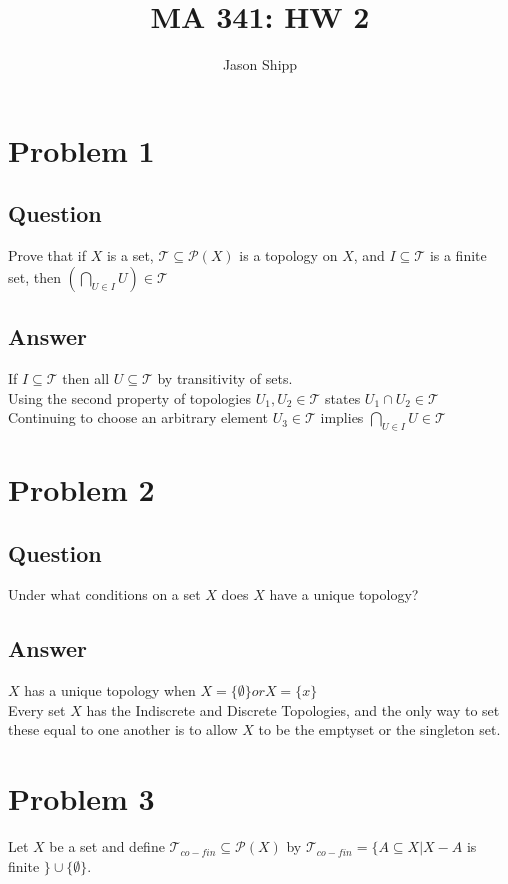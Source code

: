 \documentclass{article}
\begin{document}
\title{MA 341: HW 2}
\author{Jason Shipp}
\maketitle
\section*{Problem 1}
\subsection*{Question}
Prove that if \(X\) is a set, \(\mathscr{T} \subseteq \mathscr{P}(X)\) is a topology on \(X\), and \(I \subseteq \mathscr{T}\) is a finite set, then \((\bigcap\limits_{U \in I}U) \in \mathscr{T}\)
\subsection*{Answer}
If \(I \subseteq \mathscr{T}\) then all \(U \subseteq \mathscr{T}\) by transitivity of sets. 
\\ Using the second property of topologies \(U_{1}, U_{2} \in \mathscr{T}\) states \(U_{1} \cap U_{2} \in \mathscr{T}\)
\\ Continuing to choose an arbitrary element \(U_{3} \in \mathscr{T}\) implies \(\bigcap\limits_{U \in I}U \in \mathscr{T}\)
\section*{Problem 2}
\subsection*{Question}
Under what conditions on a set \(X\) does \(X\) have a unique topology?
\subsection*{Answer}
\(X\) has a unique topology when \(X = \{\emptyset\} or X = \{x\} \)
\\ Every set \(X\) has the Indiscrete and Discrete Topologies, and the only way to set these equal to one another is to allow \(X\) to be the emptyset or the singleton set.
\section*{Problem 3}
Let \(X\) be a set and define \(\mathscr{T}_{co-fin} \subseteq \mathscr{P}(X)\) by \(\mathscr{T}_{co-fin} = \{A \subseteq X |  X - A\) is finite \(\} \cup \{\emptyset\}\). 
\end{document}
